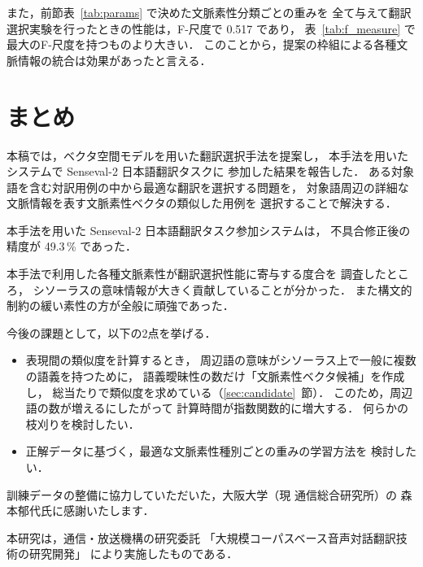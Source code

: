 また，前節表~\ref{tab:params} で決めた文脈素性分類ごとの重みを
全て与えて翻訳選択実験を行ったときの性能は，F-尺度で 0.517 であり，
表~\ref{tab:f_measure} で最大のF-尺度を持つものより大きい．
このことから，提案の枠組による各種文脈情報の統合は効果があったと言える．



\section{まとめ}
\label{sec:conclusion}
本稿では，ベクタ空間モデルを用いた翻訳選択手法を提案し，
本手法を用いたシステムで {\sc Senseval}-2 日本語翻訳タスクに
参加した結果を報告した．
ある対象語を含む対訳用例の中から最適な翻訳を選択する問題を，
対象語周辺の詳細な文脈情報を表す文脈素性ベクタの類似した用例を
選択することで解決する．

本手法を用いた {\sc Senseval}-2 日本語翻訳タスク参加システムは，
不具合修正後の精度が 49.3\,\% であった．

本手法で利用した各種文脈素性が翻訳選択性能に寄与する度合を
調査したところ，
シソーラスの意味情報が大きく貢献していることが分かった．
また構文的制約の緩い素性の方が全般に頑強であった．

今後の課題として，以下の2点を挙げる．
\begin{itemize}
 \item 表現間の類似度を計算するとき，
       周辺語の意味がシソーラス上で一般に複数の語義を持つために，
       語義曖昧性の数だけ「文脈素性ベクタ候補」を作成し，
       総当たりで類似度を求めている（\ref{sec:candidate}~節）．
       このため，周辺語の数が増えるにしたがって
       計算時間が指数関数的に増大する．
       何らかの枝刈りを検討したい．
 \item 正解データに基づく，最適な文脈素性種別ごとの重みの学習方法を
       検討したい．
\end{itemize}


\vspace{\baselineskip}

\acknowledgment

訓練データの整備に協力していただいた，大阪大学（現 通信総合研究所）の
森本郁代氏に感謝いたします．

本研究は，通信・放送機構の研究委託
「大規模コーパスベース音声対話翻訳技術の研究開発」
により実施したものである．






